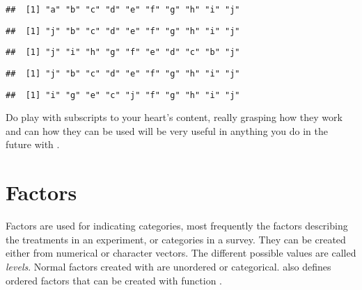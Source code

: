 \documentclass[paper=a4,headsepline,BCOR=12mm,twoside,open=right,%
titlepage,headings=small,fontsize=10pt,index=totoc,bibliography=totoc,%
captions=tableheading,captions=nooneline]{scrbook}\usepackage{knitr}
\begin{document}
\begin{knitrout}\footnotesize
{}\color{fgcolor}\begin{kframe}
\begin{alltt}
 \hlkwb{<-} \hlstd{letters[}\hlopt{:}\hlstd{]}
\end{alltt}
\begin{verbatim}
##  [1] "a" "b" "c" "d" "e" "f" "g" "h" "i" "j"
\end{verbatim}
\begin{alltt}
\hlstd{a[}\hlstd{]} \hlkwb{<-} \hlstd{a[}\hlstd{]}
\end{alltt}
\begin{verbatim}
##  [1] "j" "b" "c" "d" "e" "f" "g" "h" "i" "j"
\end{verbatim}
\begin{alltt}
 \hlkwb{<-} \hlstd{a[}\hlopt{:}\hlstd{]}
\end{alltt}
\begin{verbatim}
##  [1] "j" "i" "h" "g" "f" "e" "d" "c" "b" "j"
\end{verbatim}
\begin{alltt}
\hlstd{a[}\hlopt{:}\hlstd{]} \hlkwb{<-} 
\end{alltt}
\begin{verbatim}
##  [1] "j" "b" "c" "d" "e" "f" "g" "h" "i" "j"
\end{verbatim}
\begin{alltt}
\hlstd{a[}\hlopt{:}\hlstd{]} \hlkwb{<-} \hlstd{a[}\hlstd{(}\hlstd{,}\hlstd{)]}
\end{alltt}
\begin{verbatim}
##  [1] "i" "g" "e" "c" "j" "f" "g" "h" "i" "j"
\end{verbatim}
\end{kframe}
\end{knitrout}

Do play with subscripts to your heart's content, really grasping how they work and can how they can be used will be very useful in anything you do in the future with \R.

\section{Factors}

Factors are used for indicating categories, most frequently the factors describing the treatments in an experiment, or categories in a survey. They can be created either from numerical or character vectors. The different possible values are called \emph{levels}. Normal factors created with  are unordered or categorical. \R also defines ordered factors that can be created with function .
\end{document}
